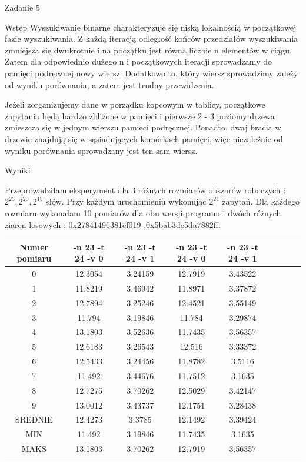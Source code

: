 \documentclass[11pt,wide]{mwart}
\begin{document}
 
 \begin{section}{Zadanie 5}
 
 \begin{subsection}{Wstęp}
 	Wyszukiwanie binarne charakteryzuje się niską lokalnością w początkowej fazie wyszukiwania. Z każdą iteracją odległość końców przedziałów wyszukiwania zmniejsza się dwukrotnie i na początku jest równa liczbie n elementów w ciągu. Zatem dla odpowiednio dużego n i początkowych iteracji sprowadzamy do pamięci podręcznej nowy wiersz. Dodatkowo to, który wiersz sprowadzimy zależy od wyniku porównania, a zatem jest trudny przewidzenia. 
 	
 	Jeżeli zorganizujemy dane w porządku kopcowym w tablicy, początkowe zapytania będą bardzo zbliżone w pamięci i pierwsze 2 - 3 poziomy drzewa zmieszczą się w jednym wierszu pamięci podręcznej. Ponadto, dwaj bracia w drzewie znajdują się w sąsiadujących komórkach pamięci, więc niezaleźnie od wyniku porównania sprowadzany jest ten sam wiersz. 
 
 \end{subsection}
 
 \begin{subsection}{Wyniki}
 
 Przeprowadziłam eksperyment dla 3 różnych rozmiarów obszarów roboczych : \( 2^ {23} , 2^{20}, 2^{15}\) słów. Przy każdym uruchomieniu wykonując \(2^{24}\) zapytań. Dla każdego rozmiaru wykonałam 10 pomiarów dla obu wersji programu i dwóch różnych ziaren losowych : 0x27841496381ef019 ,0x5bab3de5da7882ff.
 
\begin{center}
\begin{tabular}{|c|c|c|c|c|c|c|c|c|}
\hline
Numer pomiaru & -n 23 -t 24 -v 0 & -n 23 -t 24 -v 1 & -n 23 -t 24 -v 0 & -n 23 -t 24 -v 1\\
\hline
0 & 12.3054 & 3.24159 & 12.7919 & 3.43522\\
\hline
1 & 11.8219 & 3.46942 & 11.8971 & 3.37872\\
\hline
2 & 12.7894 & 3.25246 & 12.4521 & 3.55149\\
\hline
3 & 11.794 & 3.19846 & 11.784 & 3.29874\\
\hline
4 & 13.1803 & 3.52636 & 11.7435 & 3.56357\\
\hline
5 & 12.6183 & 3.26543 & 12.516 & 3.33372\\
\hline
6 & 12.5433 & 3.24456 & 11.8782 & 3.5116\\
\hline
7 & 11.492 & 3.44676 & 11.7512 & 3.1635\\
\hline
8 & 12.7275 & 3.70262 & 12.5029 & 3.42147\\
\hline
9 & 13.0012 & 3.43737 & 12.1751 & 3.28438\\
\hline
SREDNIE & 12.4273 & 3.3785 & 12.1492 & 3.39424\\
\hline
MIN & 11.492 & 3.19846 & 11.7435 & 3.1635\\
\hline
MAKS & 13.1803 & 3.70262 & 12.7919 & 3.56357\\
\hline
\end{tabular}
\end{center}


\end{subsection}
\end{section}
\end{document}
